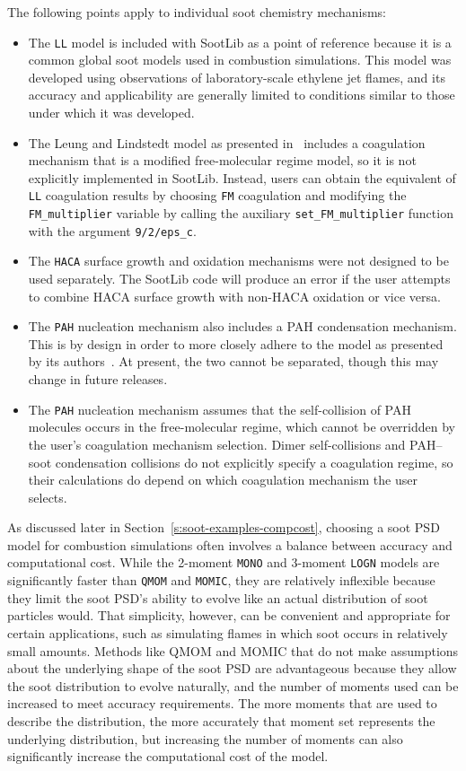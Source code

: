 \documentclass[preprint,letterpaper]{elsarticle}
\begin{document}
The following points apply to individual soot chemistry mechanisms:
\begin{itemize}
    \item The \texttt{LL} model is included with SootLib as a point of reference because it is a common global soot models used in combustion simulations. This model was developed using observations of laboratory-scale ethylene jet flames, and its accuracy and applicability are generally limited to conditions similar to those under which it was developed.
    \item The Leung and Lindstedt model as presented in~\cite{Leung_1991} includes a coagulation mechanism that is a modified free-molecular regime model, so it is not explicitly implemented in SootLib. Instead, users can obtain the equivalent of \texttt{LL} coagulation results by choosing \texttt{FM} coagulation and modifying the \texttt{FM\_multiplier} variable by calling the auxiliary \texttt{set\_FM\_multiplier} function with the argument \texttt{9/2/eps\_c}.
    \item The \texttt{HACA} surface growth and oxidation mechanisms were not designed to be used separately. The SootLib code will produce an error if the user attempts to combine HACA surface growth with non-HACA oxidation or vice versa.
    \item The \texttt{PAH} nucleation mechanism also includes a PAH condensation mechanism. This is by design in order to more closely adhere to the model as presented by its authors~\cite{Blanquart_2009c}. At present, the two cannot be separated, though this may change in future releases.
    \item The \texttt{PAH} nucleation mechanism assumes that the self-collision of PAH molecules occurs in the free-molecular regime, which cannot be overridden by the user's coagulation mechanism selection. Dimer self-collisions and PAH--soot condensation collisions do not explicitly specify a coagulation regime, so their calculations do depend on which coagulation mechanism the user selects.
\end{itemize}

As discussed later in Section~\ref{s:soot-examples-compcost}, choosing a soot PSD model for combustion simulations often involves a balance between accuracy and computational cost. While the 2-moment \texttt{MONO} and 3-moment \texttt{LOGN} models are significantly faster than \texttt{QMOM} and \texttt{MOMIC}, they are relatively inflexible because they limit the soot PSD's ability to evolve like an actual distribution of soot particles would. That simplicity, however, can be convenient and appropriate for certain applications, such as simulating flames in which soot occurs in relatively small amounts. Methods like QMOM and MOMIC that do not make assumptions about the underlying shape of the soot PSD are advantageous because they allow the soot distribution to evolve naturally, and the number of moments used can be increased to meet accuracy requirements. The more moments that are used to describe the distribution, the more accurately that moment set represents the underlying distribution, but increasing the number of moments can also significantly increase the computational cost of the model.
\end{document}
